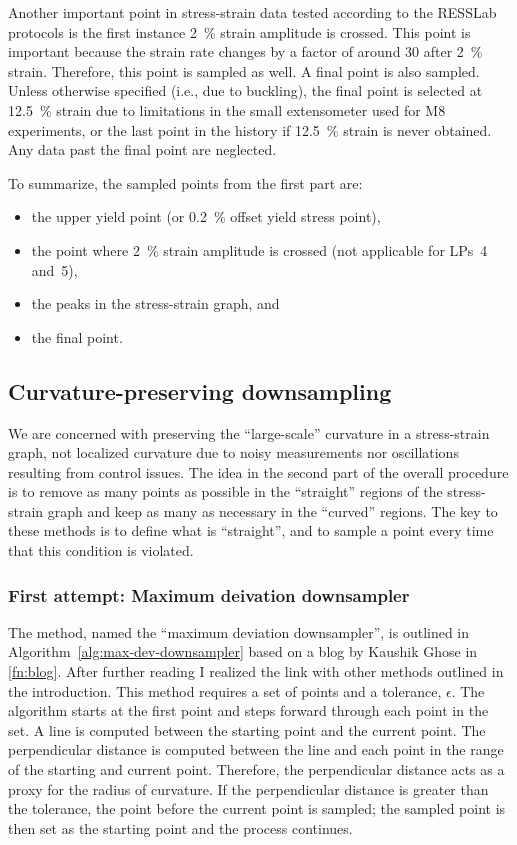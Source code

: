 \documentclass[a4paper,11pt]{article}
\begin{document}
Another important point in stress-strain data tested according to the RESSLab protocols is the first instance 2~\% strain amplitude is crossed.
This point is important because the strain rate changes by a factor of around 30 after 2~\% strain.
Therefore, this point is sampled as well.
A final point is also sampled.
Unless otherwise specified (i.e., due to buckling), the final point is selected at 12.5~\% strain due to limitations in the small extensometer used for M8 experiments, or the last point in the history if 12.5~\% strain is never obtained.
Any data past the final point are neglected.

To summarize, the sampled points from the first part are:
\begin{itemize}
    \item the upper yield point (or 0.2~\% offset yield stress point),
    \item the point where 2~\% strain amplitude is crossed (not applicable for LPs~4 and~5),
    \item the peaks in the stress-strain graph, and
    \item the final point.
\end{itemize}

\subsection{Curvature-preserving downsampling}

We are concerned with preserving the ``large-scale'' curvature in a stress-strain graph, not localized curvature due to noisy measurements nor oscillations resulting from control issues.
The idea in the second part of the overall procedure is to remove as many points as possible in the ``straight'' regions of the stress-strain graph and keep as many as necessary in the ``curved'' regions.
The key to these methods is to define what is ``straight'', and to sample a point every time that this condition is violated.

\subsubsection{First attempt: Maximum deivation downsampler}

The method, named the ``maximum deviation downsampler'', is outlined in Algorithm~\ref{alg:max-dev-downsampler} based on a blog by Kaushik Ghose in \cref{fn:blog}.
After further reading I realized the link with other methods outlined in the introduction.
This method requires a set of points and a tolerance, $\epsilon$.
The algorithm starts at the first point and steps forward through each point in the set.
A line is computed between the starting point and the current point.
The perpendicular distance is computed between the line and each point in the range of the starting and current point.
Therefore, the perpendicular distance acts as a proxy for the radius of curvature.
If the perpendicular distance is greater than the tolerance, the point before the current point is sampled; the sampled point is then set as the starting point and the process continues.
\end{document}
